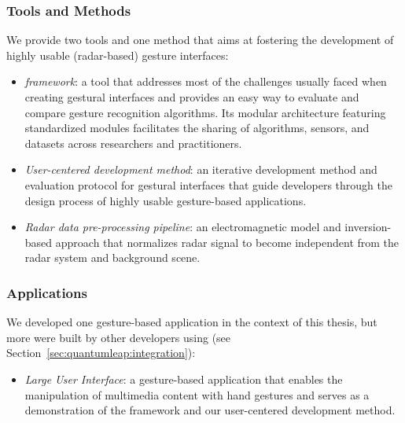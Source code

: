 \subsubsection{Tools and Methods}
We provide two tools and one method that aims at fostering the development of highly usable (radar-based) gesture interfaces:
\begin{itemize}
    \item \textit{\ql framework}: a tool that addresses most of the challenges usually faced when creating gestural interfaces and provides an easy way to evaluate and compare gesture recognition algorithms. Its modular architecture featuring standardized modules facilitates the sharing of algorithms, sensors, and datasets across researchers and practitioners.
    \item \textit{User-centered development method}: an iterative development method and evaluation protocol for gestural interfaces that guide developers through the design process of highly usable gesture-based applications.
    \item \textit{Radar data pre-processing pipeline}: an electromagnetic model and inversion-based approach that normalizes radar signal to become independent from the radar system and background scene.
\end{itemize}

\subsubsection{Applications}
We developed one gesture-based application in the context of this thesis, but more were built by other developers using \ql (see Section~\ref{sec:quantumleap:integration}): 
\begin{itemize}
    \item \textit{Large User Interface}: a gesture-based application that enables the manipulation of multimedia content with hand gestures and serves as a demonstration of the \ql framework and our user-centered development method.
\end{itemize}

